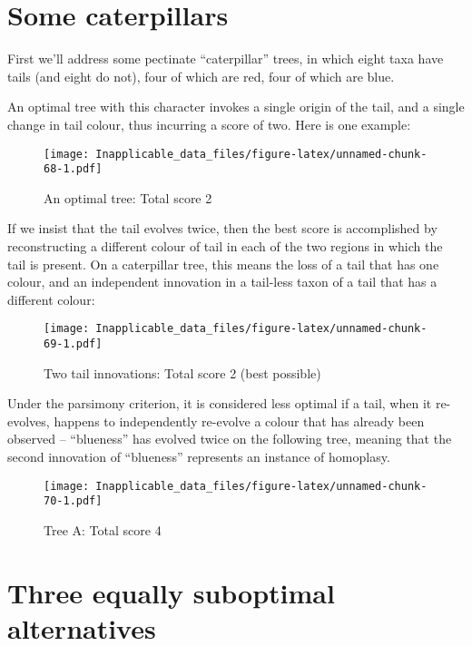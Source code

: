 \documentclass[]{book}
\theoremstyle{definition}
\theoremstyle{definition}
\theoremstyle{definition}
\theoremstyle{remark}
\begin{document}
\hypertarget{some-caterpillars}{%
\section{Some caterpillars}\label{some-caterpillars}}

First we'll address some pectinate ``caterpillar'' trees, in which eight
taxa have tails (and eight do not), four of which are red, four of which
are blue.

An optimal tree with this character invokes a single origin of the tail,
and a single change in tail colour, thus incurring a score of two. Here
is one example:

\begin{figure}
\centering
\texttt{[image: Inapplicable\_data\_files/figure-latex/unnamed-chunk-68-1.pdf]}
\caption{\label{fig:unnamed-chunk-68}An optimal tree: Total score 2}
\end{figure}

If we insist that the tail evolves twice, then the best score is
accomplished by reconstructing a different colour of tail in each of the
two regions in which the tail is present. On a caterpillar tree, this
means the loss of a tail that has one colour, and an independent
innovation in a tail-less taxon of a tail that has a different colour:

\begin{figure}
\centering
\texttt{[image: Inapplicable\_data\_files/figure-latex/unnamed-chunk-69-1.pdf]}
\caption{\label{fig:unnamed-chunk-69}Two tail innovations: Total score 2
(best possible)}
\end{figure}

Under the parsimony criterion, it is considered less optimal if a tail,
when it re-evolves, happens to independently re-evolve a colour that has
already been observed -- ``blueness'' has evolved twice on the following
tree, meaning that the second innovation of ``blueness'' represents an
instance of homoplasy.

\begin{figure}
\centering
\texttt{[image: Inapplicable\_data\_files/figure-latex/unnamed-chunk-70-1.pdf]}
\caption{\label{fig:unnamed-chunk-70}Tree A: Total score 4}
\end{figure}

\hypertarget{three-equally-suboptimal-alternatives}{%
\section{Three equally suboptimal
alternatives}\label{three-equally-suboptimal-alternatives}}
\end{document}
